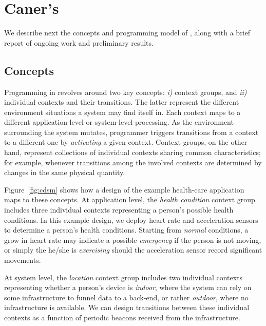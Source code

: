 \section{Caner's}
We describe next the concepts and programming model of \conesc, along
with a brief report of ongoing work and preliminary results.

\subsection{Concepts}

Programming in \conesc revolves around two key concepts: \emph{i)}
context groups, and \emph{ii)} individual contexts and their
transitions. The latter represent the different environment situations
a system may find itself in. Each context maps to a different
application-level or system-level processing. As the environment
surrounding the system mutates, programmer triggers transitions from a
context to a different one by \emph{activating} a given
context. Context groups, on the other hand, represent collections of
individual contexts sharing common characteristics; for example,
whenever transitions among the involved contexts are determined by
changes in the same physical quantity.



Figure~\ref{fig:cdsm} shows how a design of the example health-care
application maps to these concepts. At application level, the
\emph{health condition} context group includes three individual
contexts representing a person's possible health conditions. In this
example design, we deploy heart rate and acceleration sensors to
determine a person's health conditions. Starting from \emph{normal}
conditions, a grow in heart rate may indicate a possible
\emph{emergency} if the person is not moving, or simply the he/she is
\emph{exercising} should the acceleration sensor record significant
movements.

At system level, the \emph{location} context group
includes two individual contexts representing whether a person's
device is \emph{indoor}, where the system can rely on some
infrastructure to funnel data to a back-end, or rather \emph{outdoor},
where no infrastructure is available. We can design transitions
between these individual contexts as a function of periodic beacons
received from the infrastructure.

